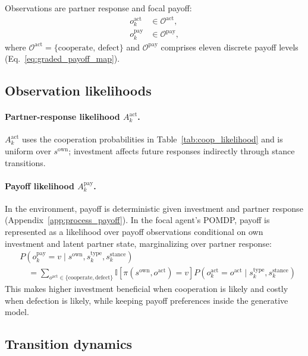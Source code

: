 Observations are partner response and focal payoff:
\begin{align}
o_k^{\text{act}} &\in \mathcal{O}^{\text{act}}, \nonumber \\
o_k^{\text{pay}} &\in \mathcal{O}^{\text{pay}}, \nonumber
\end{align}
where $\mathcal{O}^{\text{act}}=\{\text{cooperate, defect}\}$ and $\mathcal{O}^{\text{pay}}$ comprises eleven discrete payoff levels (Eq.~\eqref{eq:graded_payoff_map}).

\subsection{Observation likelihoods}
\label{app:pomdp_likelihoods}

\paragraph{Partner-response likelihood \(A^{\mathrm{act}}_k\).}
\(A^{\mathrm{act}}_k\) uses the cooperation probabilities in Table~\ref{tab:coop_likelihood} and is uniform over \(s^{\mathrm{own}}\); investment affects future responses indirectly through stance transitions.

\paragraph{Payoff likelihood \(A^{\mathrm{pay}}_k\).}
In the environment, payoff is deterministic given investment and partner response (Appendix~\ref{app:process_payoff}). In the focal agent's POMDP, payoff is represented as a likelihood over payoff observations conditional on own investment and latent partner state, marginalizing over partner response:
\begin{equation}
\begin{split}
&P(o^{\mathrm{pay}}_k=v \mid s^{\mathrm{own}},s^{\mathrm{type}}_k,s^{\mathrm{stance}}_k) \\
&\quad= \sum_{o^{\mathrm{act}}\in\{\mathrm{cooperate},\mathrm{defect}\}}
\mathbb{I}\!\left[\pi(s^{\mathrm{own}},o^{\mathrm{act}})=v\right]
P(o^{\mathrm{act}}_k=o^{\mathrm{act}} \mid s^{\mathrm{type}}_k,s^{\mathrm{stance}}_k)
\end{split}
\label{eq:a_pay_marginal}
\end{equation}
This makes higher investment beneficial when cooperation is likely and costly when defection is likely, while keeping payoff preferences inside the generative model.

\subsection{Transition dynamics}

